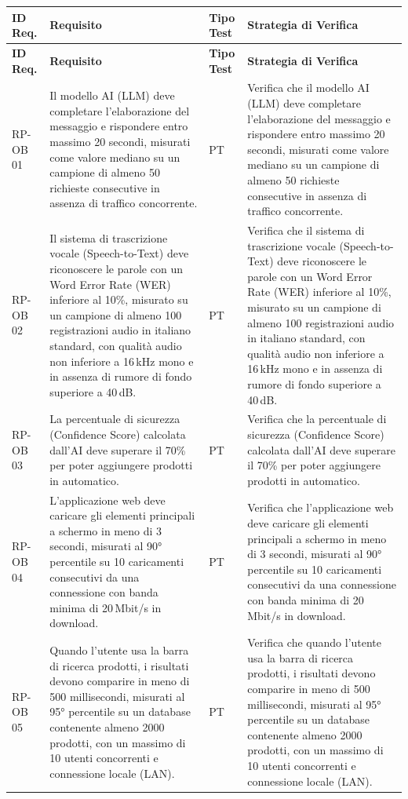\documentclass[a4paper,11pt,oneside]{scrartcl}
\begin{document}
\begin{longtable}{|p{1.5cm}|p{5.5cm}|p{1.8cm}|p{5cm}|}
\hline
\textbf{ID Req.} & \textbf{Requisito} & \textbf{Tipo Test} & \textbf{Strategia di Verifica} \\
\hline
\endfirsthead
\hline
\textbf{ID Req.} & \textbf{Requisito} & \textbf{Tipo Test} & \textbf{Strategia di Verifica} \\
\hline
\endhead

RP-OB 01 & Il modello AI (LLM) deve completare l'elaborazione del messaggio e rispondere entro massimo 20 secondi, misurati come valore mediano su un campione di almeno 50 richieste consecutive in assenza di traffico concorrente. & PT & Verifica che il modello AI (LLM) deve completare l'elaborazione del messaggio e rispondere entro massimo 20 secondi, misurati come valore mediano su un campione di almeno 50 richieste consecutive in assenza di traffico concorrente. \\ \hline
RP-OB 02 & Il sistema di trascrizione vocale (Speech-to-Text) deve riconoscere le parole con un Word Error Rate (WER) inferiore al 10\%, misurato su un campione di almeno 100 registrazioni audio in italiano standard, con qualità audio non inferiore a 16\,kHz mono e in assenza di rumore di fondo superiore a 40\,dB. & PT & Verifica che il sistema di trascrizione vocale (Speech-to-Text) deve riconoscere le parole con un Word Error Rate (WER) inferiore al 10\%, misurato su un campione di almeno 100 registrazioni audio in italiano standard, con qualità audio non inferiore a 16\,kHz mono e in assenza di rumore di fondo superiore a 40\,dB. \\ \hline
RP-OB 03 & La percentuale di sicurezza (Confidence Score) calcolata dall'AI deve superare il 70\% per poter aggiungere prodotti in automatico. & PT & Verifica che la percentuale di sicurezza (Confidence Score) calcolata dall'AI deve superare il 70\% per poter aggiungere prodotti in automatico. \\ \hline
RP-OB 04 & L'applicazione web deve caricare gli elementi principali a schermo in meno di 3 secondi, misurati al 90° percentile su 10 caricamenti consecutivi da una connessione con banda minima di 20\,Mbit/s in download. & PT & Verifica che l'applicazione web deve caricare gli elementi principali a schermo in meno di 3 secondi, misurati al 90° percentile su 10 caricamenti consecutivi da una connessione con banda minima di 20\,Mbit/s in download. \\ \hline
RP-OB 05 & Quando l'utente usa la barra di ricerca prodotti, i risultati devono comparire in meno di 500 millisecondi, misurati al 95° percentile su un database contenente almeno 2000 prodotti, con un massimo di 10 utenti concorrenti e connessione locale (LAN). & PT & Verifica che quando l'utente usa la barra di ricerca prodotti, i risultati devono comparire in meno di 500 millisecondi, misurati al 95° percentile su un database contenente almeno 2000 prodotti, con un massimo di 10 utenti concorrenti e connessione locale (LAN). \\ \hline

\end{longtable}
\end{document}
